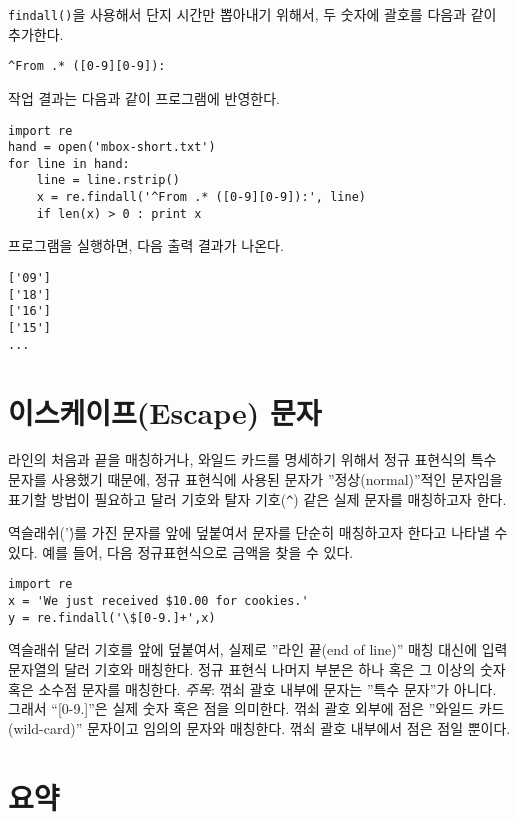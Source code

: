 {\tt findall()}을 사용해서 단지 시간만 뽑아내기 위해서, 두 숫자에 괄호를 다음과 같이 추가한다.

\beforeverb
\begin{verbatim}
^From .* ([0-9][0-9]):
\end{verbatim}
\afterverb
%

작업 결과는 다음과 같이 프로그램에 반영한다.

\beforeverb
\begin{verbatim}
import re
hand = open('mbox-short.txt')
for line in hand:
    line = line.rstrip()
    x = re.findall('^From .* ([0-9][0-9]):', line)
    if len(x) > 0 : print x
\end{verbatim}
\afterverb
%

프로그램을 실행하면, 다음 출력 결과가 나온다.

\beforeverb
\begin{verbatim}
['09']
['18']
['16']
['15']
...
\end{verbatim}
\afterverb
%

\section{이스케이프(Escape) 문자}

라인의 처음과 끝을 매칭하거나, 와일드 카드를 명세하기 위해서 정규 표현식의 특수 문자를 사용했기 때문에,
정규 표현식에 사용된 문자가 ''정상(normal)''적인 문자임을 표기할 방법이 필요하고
달러 기호와 탈자 기호({\verb"^"}) 같은 실제 문자를 매칭하고자 한다.

역슬래쉬('\')를 가진 문자를 앞에 덮붙여서 문자를 단순히 매칭하고자 한다고 나타낼 수 있다.
예를 들어, 다음 정규표현식으로 금액을 찾을 수 있다.

\beforeverb
\begin{verbatim}
import re
x = 'We just received $10.00 for cookies.'
y = re.findall('\$[0-9.]+',x)
\end{verbatim}
\afterverb
%

역슬래쉬 달러 기호를 앞에 덮붙여서, 실제로 ''라인 끝(end of line)'' 매칭 대신에 입력 문자열의 달러 기호와 매칭한다.
정규 표현식 나머지 부분은 하나 혹은 그 이상의 숫자 혹은 소수점 문자를 매칭한다.
{\em 주목}: 꺾쇠 괄호 내부에 문자는 ''특수 문자''가 아니다. 
그래서 ``[0-9.]''은 실제 숫자 혹은 점을 의미한다.
꺾쇠 괄호 외부에 점은 ''와일드 카드(wild-card)'' 문자이고 임의의 문자와 매칭한다. 
꺾쇠 괄호 내부에서 점은 점일 뿐이다.

\section{요약}

